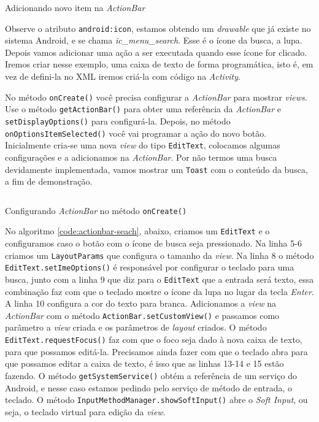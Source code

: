 \documentclass[a4paper,12pt,brazil]{book}
\begin{document}
\begin{singlespace}
		\begin{listing}[H]
		\inputminted[linenos=true,fontsize=\small,frame=lines, framesep=2mm, tabsize=2,numbersep=5pt]{xml}{src/design/newitem.xml}
		\caption{Adicionando novo item na \emph{ActionBar}}
		\end{listing}
		
		Observe o atributo \texttt{android:icon}, estamos obtendo um \emph{drawable} que já existe no sistema Android, e se chama \emph{ic\_menu\_search}. Esse é o ícone da busca, a lupa. Depois vamos adicionar uma ação a ser executada quando esse ícone for clicado. Iremos criar nesse exemplo, uma caixa de texto de forma programática, isto é, em vez de defini-la no XML iremos criá-la com código na \emph{Activity}. 
		
		No método \texttt{onCreate()} você precisa configurar a \emph{ActionBar} para mostrar \emph{views}. Use o método \texttt{getActionBar()} para obter uma referência da \emph{ActionBar} e \texttt{setDisplayOptions()} para configurá-la. Depois, no método \texttt{onOptionsItemSelected()} você vai programar a ação do novo botão. Inicialmente cria-se uma nova \emph{view} do tipo \texttt{EditText}, colocamos algumas configurações e a adicionamos na \emph{ActionBar}. Por não termos uma busca devidamente implementada, vamos mostrar um \texttt{Toast} com o conteúdo da busca, a fim de demonstração.
		
		\begin{listing}[H]
		\inputminted[linenos=true,fontsize=\small,frame=lines, framesep=2mm, tabsize=2,numbersep=5pt]{java}{src/design/actionbar-oncreate.java}
		\caption{Configurando \emph{ActionBar} no método \texttt{onCreate()}}
		\end{listing}
		
		No algoritmo \ref{code:actionbar-seach}, abaixo, criamos um \texttt{EditText} e o configuramos caso o botão com o ícone de busca seja pressionado. Na linha 5-6 criamos um \texttt{LayoutParams} que configura o tamanho da \emph{view}. Na linha 8 o método \texttt{EditText.setImeOptions()} é responsável por configurar o teclado para uma busca, junto com a linha 9 que diz para o \texttt{EditText} que a entrada será texto, essa combinação faz com que o teclado mostre o ícone da lupa no lugar da tecla \emph{Enter}. A linha 10 configura a cor do texto para branca. Adicionamos a \emph{view} na \emph{ActionBar} com o método \texttt{ActionBar.setCustomView()} e passamos como parâmetro a \emph{view} criada e os parâmetros de \emph{layout} criados. O método \texttt{EditText.requestFocus()} faz com que o foco seja dado à nova caixa de texto, para que possamos editá-la. Precisamos ainda fazer com que o teclado abra para que possamos editar a caixa de texto, é isso que as linhas 13-14 e 15 estão fazendo. O método \texttt{getSystemService()} obtém a referência de um serviço do Android, e nesse caso estamos pedindo pelo serviço de método de entrada, o teclado. O método \texttt{InputMethodManager.showSoftInput()} abre o \emph{Soft Input}, ou seja, o teclado virtual para edição da \emph{view}. 
		

\end{singlespace}
\end{document}
